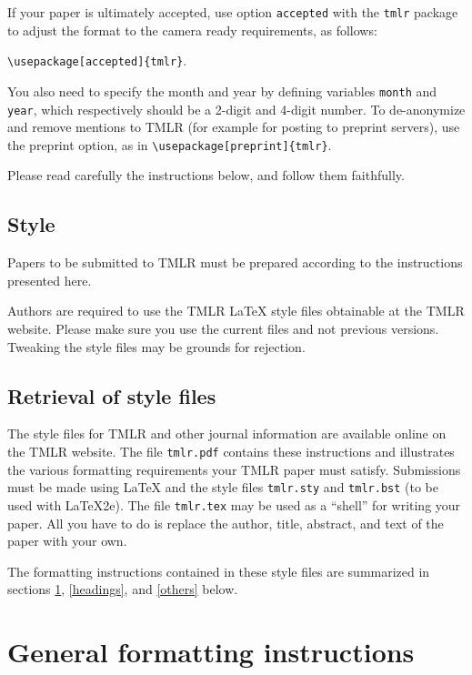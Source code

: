 \documentclass[10pt]{article} %
\begin{document}
If your paper is ultimately accepted, use option {\tt accepted} with the {\tt tmlr} 
package to adjust the format to the camera ready requirements, as follows:
\begin{center}  
  {\tt {\textbackslash}usepackage[accepted]\{tmlr\}}. 
\end{center}
You also need to specify the month and year
by defining variables {\tt month} and {\tt year}, which respectively
should be a 2-digit and 4-digit number. To de-anonymize and remove mentions
to TMLR (for example for posting to preprint servers), use the preprint option,
as in {\tt {\textbackslash}usepackage[preprint]\{tmlr\}}. 

Please read carefully the instructions below, and follow them
faithfully.

\subsection{Style}

Papers to be submitted to TMLR must be prepared according to the
instructions presented here.

Authors are required to use the TMLR \LaTeX{} style files obtainable at the
TMLR website. Please make sure you use the current files and
not previous versions. Tweaking the style files may be grounds for rejection.

\subsection{Retrieval of style files}

The style files for TMLR and other journal information are available online on
the TMLR website.
The file \verb+tmlr.pdf+ contains these
instructions and illustrates the
various formatting requirements your TMLR paper must satisfy.
Submissions must be made using \LaTeX{} and the style files
\verb+tmlr.sty+ and \verb+tmlr.bst+ (to be used with \LaTeX{}2e). The file
\verb+tmlr.tex+ may be used as a ``shell'' for writing your paper. All you
have to do is replace the author, title, abstract, and text of the paper with
your own.

The formatting instructions contained in these style files are summarized in
sections \ref{gen_inst}, \ref{headings}, and \ref{others} below.

\section{General formatting instructions}
\label{gen_inst}
\end{document}

